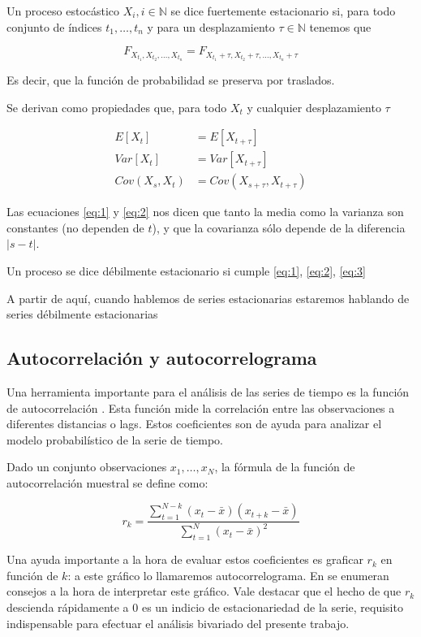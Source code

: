 \begin{definicion}
Un proceso estocástico $X_i, i \in \mathbb{N}$ se dice fuertemente estacionario si, para todo conjunto de índices $t_1, \ldots , t_n$ y para un desplazamiento $\tau \in \mathbb{N}$ tenemos que

\begin{displaymath}
    F_{X_{t_1}, X_{t_2}, \ldots , X_{t_n} } = F_{X_{t_1} + \tau, X_{t_2} + \tau, \ldots , X_{t_n} + \tau}
\end{displaymath}

Es decir, que la función de probabilidad se preserva por traslados.
\end{definicion}

Se derivan como propiedades que, para todo $X_t$ y cualquier desplazamiento $\tau$

\begin{align}
    E[X_t] &= E[X_{t + \tau}] \label{eq:1} \\
    Var[X_t] &= Var[X_{t + \tau}] \label{eq:2} \\
    Cov(X_s, X_t) &= Cov(X_{s+\tau}, X_{t + \tau}) \label{eq:3}
\end{align}

Las ecuaciones \ref{eq:1} y \ref{eq:2} nos dicen que tanto la media como la varianza son constantes (no dependen de $t$), y que la covarianza sólo depende de la diferencia $| s - t |$.


\begin{definicion}
    Un proceso se dice débilmente estacionario si cumple \ref{eq:1}, \ref{eq:2}, \ref{eq:3}
\end{definicion}

A partir de aquí, cuando hablemos de series estacionarias estaremos hablando de series débilmente estacionarias

\subsection{Autocorrelación y autocorrelograma}
\label{sec:autocorrelation}

Una herramienta importante para el análisis de las series de tiempo es la función de autocorrelación \cite[p22]{CHATFIELD}. Esta función mide la correlación entre las observaciones a diferentes distancias o lags. Estos coeficientes son de ayuda para analizar el modelo probabilístico de la serie de tiempo.

Dado un conjunto observaciones $x_1, \ldots , x_N$, la fórmula de la función de autocorrelación muestral se define como:

\begin{equation}
  r_k =  \frac
  {\sum\limits_{t=1}^{N-k} (x_t - \bar{x}) (x_{t+k} - \bar{x}) }
  {\sum\limits_{t=1}^{N} (x_t - \bar{x})^2}
\end{equation}

Una ayuda importante a la hora de evaluar estos coeficientes es graficar $r_k$ en función de $k$: a este gráfico lo llamaremos autocorrelograma. En \cite[p25]{CHATFIELD} se enumeran consejos a la hora de interpretar este gráfico. Vale destacar que el hecho de que $r_k$ descienda rápidamente a 0 es un indicio de estacionariedad de la serie, requisito indispensable para efectuar el análisis bivariado del presente trabajo.
